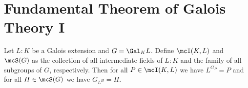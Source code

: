\documentclass[a4paper]{article}
\begin{document}
\section{Fundamental Theorem of Galois Theory I}
\begin{ttheorem}
  Let \( L:K \) be a Galois extension and \( G=\Gal_K L \). Define \( \mcI(K,L) \) and \( \mcS(G) \) as the collection of all intermediate fields of \(L:K\) and the family of all subgroups of \( G \), respectively.
  Then for all \( P\in \mcI(K,L) \) we have \( L^{G_P} = P \) and for all \( H\in \mcS(G) \) we have \( G_{L^H} = H \).
\end{ttheorem}








\end{document}
